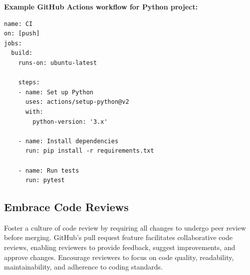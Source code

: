 \documentclass[hidelinks]{article}
\begin{document}
\textbf{Example GitHub Actions workflow for Python project:}
\begin{verbatim}
name: CI
on: [push]
jobs:
  build:
    runs-on: ubuntu-latest

    steps:
    - name: Set up Python
      uses: actions/setup-python@v2
      with:
        python-version: '3.x'

    - name: Install dependencies
      run: pip install -r requirements.txt

    - name: Run tests
      run: pytest
\end{verbatim}

\subsection*{Embrace Code Reviews}
Foster a culture of code review by requiring all changes to undergo peer review before merging. GitHub's pull request feature facilitates collaborative code reviews, enabling reviewers to provide feedback, suggest improvements, and approve changes. Encourage reviewers to focus on code quality, readability, maintainability, and adherence to coding standards.
\end{document}
